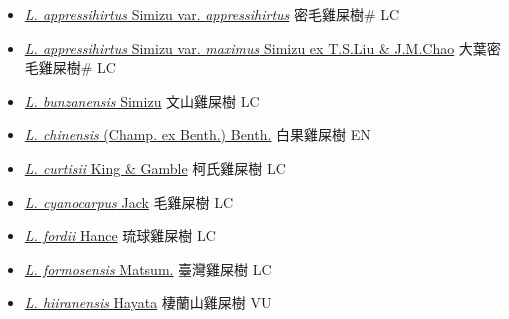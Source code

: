 \begin{itemize}
  \begin{itemize}
        \item[] \href{http://www.theplantlist.org/tpl1.1/search?q=Lasianthus+appressihirtus+var.+appressihirtus}{\textit{L. appressihirtus} Simizu var. \textit{appressihirtus}}   密毛雞屎樹\# LC
        \item[] \href{http://www.theplantlist.org/tpl1.1/search?q=Lasianthus+appressihirtus+var.+maximus}{\textit{L. appressihirtus} Simizu var. \textit{maximus} Simizu ex T.S.Liu \& J.M.Chao}   大葉密毛雞屎樹\# LC
        \item[] \href{http://www.theplantlist.org/tpl1.1/search?q=Lasianthus+bunzanensis}{\textit{L. bunzanensis} Simizu}   文山雞屎樹 LC
        \item[] \href{http://www.theplantlist.org/tpl1.1/search?q=Lasianthus+chinensis}{\textit{L. chinensis} (Champ. ex Benth.) Benth.}   白果雞屎樹 EN
        \item[] \href{http://www.theplantlist.org/tpl1.1/search?q=Lasianthus+curtisii}{\textit{L. curtisii} King \& Gamble}   柯氏雞屎樹 LC
        \item[] \href{http://www.theplantlist.org/tpl1.1/search?q=Lasianthus+cyanocarpus}{\textit{L. cyanocarpus} Jack}   毛雞屎樹 LC
        \item[] \href{http://www.theplantlist.org/tpl1.1/search?q=Lasianthus+fordii}{\textit{L. fordii} Hance}   琉球雞屎樹 LC
        \item[] \href{http://www.theplantlist.org/tpl1.1/search?q=Lasianthus+formosensis}{\textit{L. formosensis} Matsum.}   臺灣雞屎樹 LC
        \item[] \href{http://www.theplantlist.org/tpl1.1/search?q=Lasianthus+hiiranensis}{\textit{L. hiiranensis} Hayata}   棲蘭山雞屎樹 VU

\end{itemize}
\end{itemize}
